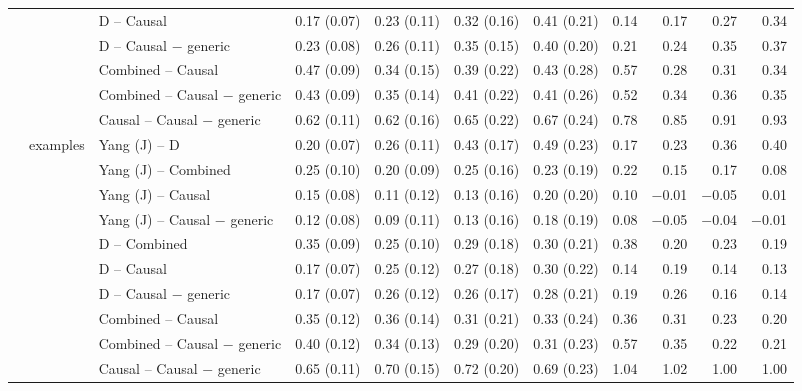 \begin{tabular}{@{}lllrrrrrrrr@{}}
 &  & D -- Causal & 0.17 (0.07) & 0.23 (0.11) & 0.32 (0.16) & 0.41 (0.21) & 0.14 & 0.17 & 0.27 & 0.34 \\
 &  & D -- Causal $-$ generic & 0.23 (0.08) & 0.26 (0.11) & 0.35 (0.15) & 0.40 (0.20) & 0.21 & 0.24 & 0.35 & 0.37 \\
 &  & Combined -- Causal & 0.47 (0.09) & 0.34 (0.15) & 0.39 (0.22) & 0.43 (0.28) & 0.57 & 0.28 & 0.31 & 0.34 \\
 &  & Combined -- Causal $-$ generic & 0.43 (0.09) & 0.35 (0.14) & 0.41 (0.22) & 0.41 (0.26) & 0.52 & 0.34 & 0.36 & 0.35 \\
 &  & Causal -- Causal $-$ generic & 0.62 (0.11) & 0.62 (0.16) & 0.65 (0.22) & 0.67 (0.24) & 0.78 & 0.85 & 0.91 & 0.93 \\
\addlinespace
 & examples & Yang (J) -- D & 0.20 (0.07) & 0.26 (0.11) & 0.43 (0.17) & 0.49 (0.23) & 0.17 & 0.23 & 0.36 & 0.40 \\
 &  & Yang (J) -- Combined & 0.25 (0.10) & 0.20 (0.09) & 0.25 (0.16) & 0.23 (0.19) & 0.22 & 0.15 & 0.17 & 0.08 \\
 &  & Yang (J) -- Causal & 0.15 (0.08) & 0.11 (0.12) & 0.13 (0.16) & 0.20 (0.20) & 0.10 & $-$0.01 & $-$0.05 & 0.01 \\
 &  & Yang (J) -- Causal $-$ generic & 0.12 (0.08) & 0.09 (0.11) & 0.13 (0.16) & 0.18 (0.19) & 0.08 & $-$0.05 & $-$0.04 & $-$0.01 \\
 &  & D -- Combined & 0.35 (0.09) & 0.25 (0.10) & 0.29 (0.18) & 0.30 (0.21) & 0.38 & 0.20 & 0.23 & 0.19 \\
 &  & D -- Causal & 0.17 (0.07) & 0.25 (0.12) & 0.27 (0.18) & 0.30 (0.22) & 0.14 & 0.19 & 0.14 & 0.13 \\
 &  & D -- Causal $-$ generic & 0.17 (0.07) & 0.26 (0.12) & 0.26 (0.17) & 0.28 (0.21) & 0.19 & 0.26 & 0.16 & 0.14 \\
 &  & Combined -- Causal & 0.35 (0.12) & 0.36 (0.14) & 0.31 (0.21) & 0.33 (0.24) & 0.36 & 0.31 & 0.23 & 0.20 \\
 &  & Combined -- Causal $-$ generic & 0.40 (0.12) & 0.34 (0.13) & 0.29 (0.20) & 0.31 (0.23) & 0.57 & 0.35 & 0.22 & 0.21 \\
 &  & Causal -- Causal $-$ generic & 0.65 (0.11) & 0.70 (0.15) & 0.72 (0.20) & 0.69 (0.23) & 1.04 & 1.02 & 1.00 & 1.00 \\
\bottomrule
\end{tabular}
